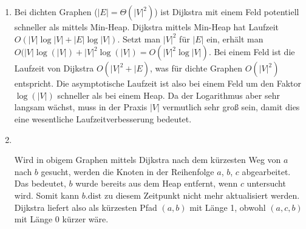 \documentclass[11pt,a4paper]{article}
\begin{document}
\begin{loesung}
\begin{enumerate}
        \item
        Bei dichten Graphen ($|E| = \Theta(|V|^2)$) ist Dijkstra mit einem Feld potentiell schneller als mittels Min-Heap.
        Dijkstra mittels Min-Heap hat Laufzeit $O(|V| \log |V| + |E| \log |V|)$.
        Setzt man $|V|^2$ für $|E|$ ein, erhält man $O(|V| \log\left(|V|\right) + |V|^2 \log\left(|V|\right) = O(|V|^2 \log |V|)$.
        Bei einem Feld ist die Laufzeit von Dijkstra $O(|V|^2 + |E)$, was für dichte Graphen $O(|V|^2)$ entspricht.
        Die asymptotische Laufzeit ist also bei einem Feld um den Faktor $\log(|V|)$ schneller als bei einem Heap.
        Da der Logarithmus aber sehr langsam wächst, muss in der Praxis $|V|$ vermutlich sehr groß sein, damit dies eine wesentliche Laufzeitverbesserung bedeutet.
        \item \ \\
        \begin{figure}[h!]
            \centering
        \end{figure}
        \FloatBarrier
        Wird in obigem Graphen mittels Dijkstra nach dem kürzesten Weg von $a$ nach $b$ gesucht, werden die Knoten in der Reihenfolge $a$, $b$, $c$ abgearbeitet.
        Das bedeutet, $b$ wurde bereits aus dem Heap entfernt, wenn $c$ untersucht wird.
        Somit kann $b.\mathrm{dist}$ zu diesem Zeitpunkt nicht mehr aktualisiert werden.
        Dijkstra liefert also als kürzesten Pfad $(a, b)$ mit Länge 1, obwohl $(a, c, b)$ mit Länge 0 kürzer wäre.


\end{enumerate}
\end{loesung}
\end{document}
